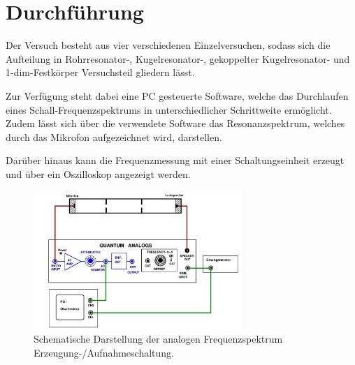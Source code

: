 \newpage
\section{Durchführung}
Der Versuch besteht aus vier verschiedenen Einzelversuchen, sodass sich die Aufteilung
in Rohrresonator-, Kugelresonator-, gekoppelter Kugelresonator- und 1-dim-Festkörper Versuchsteil gliedern lässt.

Zur Verfügung steht dabei eine PC gesteuerte Software, welche das Durchlaufen eines Schall-Frequenzspektrums 
in unterschiedlicher Schrittweite ermöglicht. Zudem lässt sich über die verwendete Software das Resonanzspektrum, welches durch das Mikrofon aufgezeichnet wird, darstellen.

Darüber hinaus kann die Frequenzmessung mit einer Schaltungseinheit
erzeugt und über ein Oszilloskop angezeigt werden.
\begin{figure}
    \center
    \includegraphics[width=0.7\textwidth]{bilder/anleitung.jpg}
    \caption{Schematische Darstellung der analogen Frequenzspektrum Erzeugung-/Aufnahmeschaltung.\cite{anleitung}}
\end{figure}

